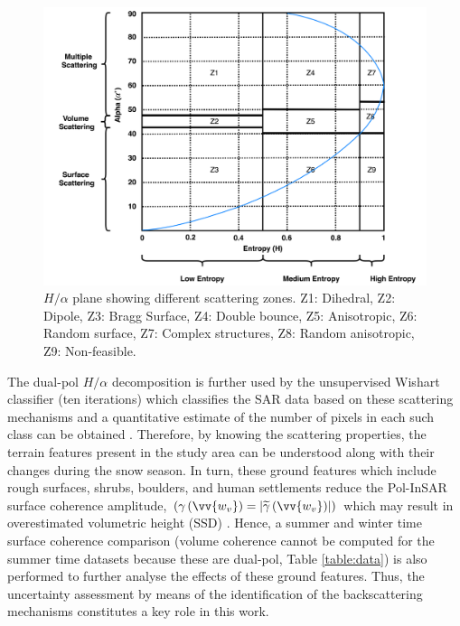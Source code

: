 \documentclass[12pt]{elsarticle}
\numberwithin{equation}{section}
\numberwithin{figure}{section}
\numberwithin{table}{section}
\begin{document}
\begin{figure}[htb]
    \centering
    \includegraphics[width=\textwidth]{Figures/Methods/HA.png}
    \caption{\doublespacing $H/{\alpha}$ plane showing different scattering zones. Z1: Dihedral, Z2: Dipole, Z3: Bragg Surface, Z4: Double
bounce, Z5: Anisotropic, Z6: Random surface, Z7: Complex structures, Z8: Random anisotropic, Z9: Non-feasible.}
    \label{fig:ha}
\end{figure}

The dual-pol $H/{\alpha}$ decomposition is further used by the unsupervised Wishart classifier (ten iterations) which classifies the SAR data based on these scattering mechanisms and a quantitative estimate of the number of pixels in each such class can be obtained \citep{Cloude2010, Lee2009}. Therefore, by knowing the scattering properties, the terrain features present in the study area can be understood along with their changes during the snow season. In turn, these ground features which include rough surfaces, shrubs, boulders, and human settlements reduce the Pol-InSAR surface coherence amplitude, $\left(\gamma\left(\vv{w_v}\right) = \left\lvert\widetilde{\gamma}\left(\vv{w_v}\right)\right\rvert\right)$ which may result in overestimated volumetric height (SSD) \citep{Cloude2010, Hajnsek2009, Kugler2015}. Hence, a summer and winter time surface coherence comparison (volume coherence cannot be computed for the summer time datasets because these are dual-pol, Table \ref{table:data}) is also performed to further analyse the effects of these ground features. Thus, the uncertainty assessment by means of the identification of the backscattering mechanisms constitutes a key role in this work.
\end{document}
